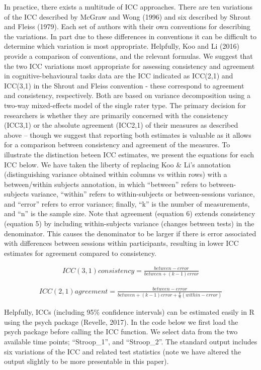 \documentclass[english,,man,floatsintext]{apa6}
\begin{document}
In practice, there exists a multitude of ICC approaches. There are ten variations of the ICC described by McGraw and Wong (1996) and six described by Shrout and Fleiss (1979). Each set of authors with their own conventions for describing the variations. In part due to these differences in conventions it can be difficult to determine which variation is most appropriate. Helpfully, Koo and Li (2016) provide a comparison of conventions, and the relevant formulas. We suggest that the two ICC variations most appropriate for assessing consistency and agreement in cognitive-behavioural tasks data are the ICC indicated as ICC(2,1) and ICC(3,1) in the Shrout and Fleiss convention - these correspond to agreement and consistency, respectively. Both are based on variance decomposition using a two-way mixed-effects model of the single rater type. The primary decision for researchers is whether they are primarily concerned with the consistency (ICC3,1) or the absolute agreement (ICC2,1) of their measures as described above -- though we suggest that reporting both estimates is valuable as it allows for a comparison between consistency and agreement of the measures. To illustrate the distinction beteen ICC estimates, we present the equations for each ICC below. We have taken the liberty of replacing Koo \& Li's annotation (distinguishing variance obtained within columns vs within rows) with a between/within subjects annotation, in which \enquote{between} refers to between-subjects variance, \enquote{within} refers to within-subjects or between-sessions variance, and \enquote{error} refers to error variance; finally, \enquote{k} is the number of measurements, and \enquote{n} is the sample size. Note that agreement (equation 6) extends consistency (equation 5) by including within-subjects variance (changes between tests) in the denominator. This causes the denominator to be larger if there is error associated with differences between sessions within participants, resulting in lower ICC estimates for agreement compared to consistency.

\begin{align}
ICC(3,1) consistency=\frac{between - error}{between + (k-1)error}  
\end{align}

\begin{align}
ICC(2,1) agreement=\frac{between - error}{between + (k-1)error + \frac{k}{n}(within - error)}  
\end{align}

Helpfully, ICCs (including 95\% confidence intervals) can be estimated easily in R using the psych package (Revelle, 2017). In the code below we first load the psych package before calling the ICC function. We select data from the two available time points; \enquote{Stroop\_1}, and \enquote{Stroop\_2}. The standard output includes six variations of the ICC and related test statistics (note we have altered the output slightly to be more presentable in this paper).
\end{document}
